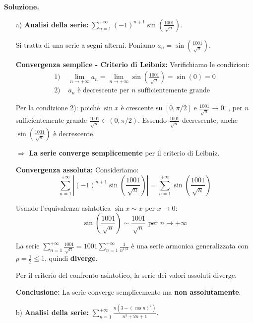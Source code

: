 \documentclass[12pt, a4paper]{article}
\newenvironment{solution}{%
    \par\noindent\textbf{Soluzione.}\medskip\par
    \normalfont
}{\par\bigskip}
\begin{document}
\begin{solution}
\begin{enumerate}
    \item[a)] \textbf{Analisi della serie:} $\displaystyle\sum_{n=1}^{+\infty} (-1)^{n+1} \sin\left(\frac{1001}{\sqrt{n}}\right)$.
    
    Si tratta di una serie a segni alterni. Poniamo $a_n = \sin\left(\frac{1001}{\sqrt{n}}\right)$.
    
    \textbf{Convergenza semplice - Criterio di Leibniz:}
    Verifichiamo le condizioni:
    \begin{align}
        \text{1) } &\lim_{n\to+\infty} a_n = \lim_{n\to+\infty} \sin\left(\frac{1001}{\sqrt{n}}\right) = \sin(0) = 0 \\
        \text{2) } &a_n \text{ è decrescente per } n \text{ sufficientemente grande}
    \end{align}
    
    Per la condizione 2): poiché $\sin x$ è crescente su $[0, \pi/2]$ e $\frac{1001}{\sqrt{n}} \to 0^+$, per $n$ sufficientemente grande $\frac{1001}{\sqrt{n}} \in (0, \pi/2)$. Essendo $\frac{1001}{\sqrt{n}}$ decrescente, anche $\sin\left(\frac{1001}{\sqrt{n}}\right)$ è decrescente.
    
    $\Rightarrow$ \textbf{La serie converge semplicemente} per il criterio di Leibniz.
    
    \textbf{Convergenza assoluta:}
    Consideriamo:
    \[\sum_{n=1}^{+\infty} \left|(-1)^{n+1} \sin\left(\frac{1001}{\sqrt{n}}\right)\right| = \sum_{n=1}^{+\infty} \sin\left(\frac{1001}{\sqrt{n}}\right)\]
    
    Usando l'equivalenza asintotica $\sin x \sim x$ per $x \to 0$:
    \[\sin\left(\frac{1001}{\sqrt{n}}\right) \sim \frac{1001}{\sqrt{n}} \text{ per } n \to +\infty\]
    
    La serie $\displaystyle\sum_{n=1}^{+\infty} \frac{1001}{\sqrt{n}} = 1001 \sum_{n=1}^{+\infty} \frac{1}{n^{1/2}}$ è una serie armonica generalizzata con $p = \frac{1}{2} \leq 1$, quindi \textbf{diverge}.
    
    Per il criterio del confronto asintotico, la serie dei valori assoluti diverge.
    
    \textbf{Conclusione:} La serie converge semplicemente ma \textbf{non assolutamente}.

    \item[b)] \textbf{Analisi della serie:} $\displaystyle\sum_{n=1}^{+\infty} \frac{n(3-(\cos n)^{2})}{n^{3}+2n+1}$.
    

\end{enumerate}
\end{solution}
\end{document}
